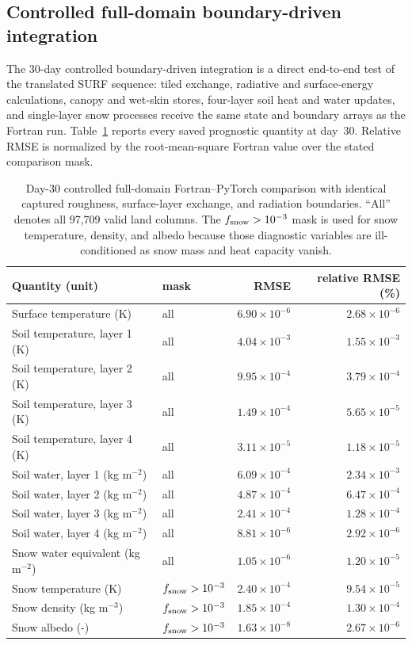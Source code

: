 \subsection{Controlled full-domain boundary-driven integration}
\label{sec:controlled-equivalence}

The 30-day controlled boundary-driven integration is a direct end-to-end test of the translated
SURF sequence: tiled exchange, radiative and surface-energy calculations,
canopy and wet-skin stores, four-layer soil heat and water updates, and
single-layer snow processes receive the same state and boundary arrays as the
Fortran run. Table~\ref{tab:controlled-30d} reports every saved prognostic
quantity at day~30. Relative RMSE is normalized by the root-mean-square
Fortran value over the stated comparison mask.

\begin{table}[t]
\caption{Day-30 controlled full-domain Fortran--PyTorch comparison with
identical captured roughness, surface-layer exchange, and radiation
boundaries. ``All'' denotes all
97,709 valid land columns. The $f_{\rm snow}>10^{-3}$ mask is used for snow
temperature, density, and albedo because those diagnostic variables are
ill-conditioned as snow mass and heat capacity vanish.}
\label{tab:controlled-30d}
\centering
\small
\begin{tabular}{llrr}
\hline
Quantity (unit) & mask & RMSE & relative RMSE (\%) \\
\hline
Surface temperature (K) & all & $6.90\times10^{-6}$ & $2.68\times10^{-6}$ \\
Soil temperature, layer 1 (K) & all & $4.04\times10^{-3}$ & $1.55\times10^{-3}$ \\
Soil temperature, layer 2 (K) & all & $9.95\times10^{-4}$ & $3.79\times10^{-4}$ \\
Soil temperature, layer 3 (K) & all & $1.49\times10^{-4}$ & $5.65\times10^{-5}$ \\
Soil temperature, layer 4 (K) & all & $3.11\times10^{-5}$ & $1.18\times10^{-5}$ \\
Soil water, layer 1 (kg m$^{-2}$) & all & $6.09\times10^{-4}$ & $2.34\times10^{-3}$ \\
Soil water, layer 2 (kg m$^{-2}$) & all & $4.87\times10^{-4}$ & $6.47\times10^{-4}$ \\
Soil water, layer 3 (kg m$^{-2}$) & all & $2.41\times10^{-4}$ & $1.28\times10^{-4}$ \\
Soil water, layer 4 (kg m$^{-2}$) & all & $8.81\times10^{-6}$ & $2.92\times10^{-6}$ \\
Snow water equivalent (kg m$^{-2}$) & all & $1.05\times10^{-6}$ & $1.20\times10^{-5}$ \\
Snow temperature (K) & $f_{\rm snow}>10^{-3}$ & $2.40\times10^{-4}$ & $9.54\times10^{-5}$ \\
Snow density (kg m$^{-3}$) & $f_{\rm snow}>10^{-3}$ & $1.85\times10^{-4}$ & $1.30\times10^{-4}$ \\
Snow albedo (-) & $f_{\rm snow}>10^{-3}$ & $1.63\times10^{-8}$ & $2.67\times10^{-6}$ \\
\hline
\end{tabular}
\end{table}

